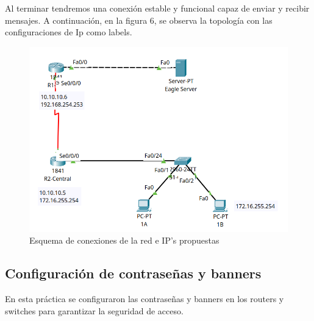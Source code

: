 \documentclass[a4paper,11pt]{article}
\begin{document}
Al terminar tendremos una conexión estable y funcional capaz de enviar y
recibir mensajes. A continuación, en la figura 6, se observa la topología con
las configuraciones de Ip como labels.

\begin{figure}[h]
    \includegraphics[width=1 \textwidth]{images/routers/config_diagram.png}
    \caption{Esquema de conexiones de la red e IP's propuestas}
\end{figure}

\newpage

\subsection{Configuración de contraseñas y banners}

En esta práctica se configuraron las contraseñas y banners en los routers y
switches para garantizar la seguridad de acceso.
\end{document}
